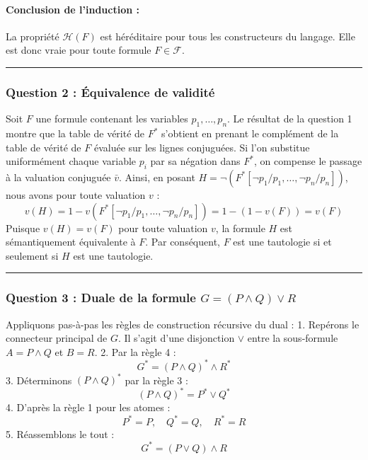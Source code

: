 \documentclass[11pt,a4paper]{article}
\begin{document}
\hypertarget{conclusion-de-linduction}{%
\paragraph{Conclusion de l'induction :}\label{conclusion-de-linduction}}

La propriété \(\mathcal{H}(F)\) est héréditaire pour tous les
constructeurs du langage. Elle est donc vraie pour toute formule
\(F \in \mathcal{F}\).

\begin{center}\rule{0.5\linewidth}{0.5pt}\end{center}

\hypertarget{question-2-uxe9quivalence-de-validituxe9}{%
\subsubsection{Question 2 : Équivalence de
validité}\label{question-2-uxe9quivalence-de-validituxe9}}

Soit \(F\) une formule contenant les variables \(p_1, \dots, p_n\). Le
résultat de la question 1 montre que la table de vérité de \(F^*\)
s'obtient en prenant le complément de la table de vérité de \(F\)
évaluée sur les lignes conjuguées. Si l'on substitue uniformément chaque
variable \(p_i\) par sa négation dans \(F^*\), on compense le passage à
la valuation conjuguée \(\bar{v}\). Ainsi, en posant
\(H = \neg (F^*[\neg p_1/p_1, \dots, \neg p_n/p_n])\), nous avons pour
toute valuation \(v\) :
\[v(H) = 1 - v(F^*[\neg p_1/p_1, \dots, \neg p_n/p_n]) = 1 - (1 - v(F)) = v(F)\]
Puisque \(v(H) = v(F)\) pour toute valuation \(v\), la formule \(H\) est
sémantiquement équivalente à \(F\). Par conséquent, \(F\) est une
tautologie si et seulement si \(H\) est une tautologie.

\begin{center}\rule{0.5\linewidth}{0.5pt}\end{center}

\hypertarget{question-3-duale-de-la-formule-g-p-land-q-lor-r}{%
\subsubsection{\texorpdfstring{Question 3 : Duale de la formule
\(G = (P \land Q) \lor R\)}{Question 3 : Duale de la formule G = (P \textbackslash land Q) \textbackslash lor R}}\label{question-3-duale-de-la-formule-g-p-land-q-lor-r}}

Appliquons pas-à-pas les règles de construction récursive du dual : 1.
Repérons le connecteur principal de \(G\). Il s'agit d'une disjonction
\(\lor\) entre la sous-formule \(A = P \land Q\) et \(B = R\). 2. Par la
règle 4 : \[G^* = (P \land Q)^* \land R^*\] 3. Déterminons
\((P \land Q)^*\) par la règle 3 : \[(P \land Q)^* = P^* \lor Q^*\] 4.
D'après la règle 1 pour les atomes :
\[P^* = P, \quad Q^* = Q, \quad R^* = R\] 5. Réassemblons le tout :
\[G^* = (P \lor Q) \land R\]
\end{document}
